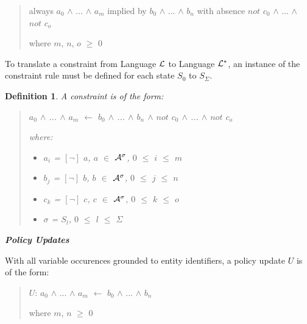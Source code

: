\documentclass[10pt, twocolumn]{article}
\newtheorem{definition}{Definition}
\begin{document}
          \begin{quote}
            always $a_{0}$ $\land$ ... $\land$ $a_{m}$
            implied by $b_{0}$ $\land$ ... $\land$ $b_{n}$
            with absence $not$ $c_{0}$ $\land$ ... $\land$ $not$ $c_{o}$

            where $m$, $n$, $o$ $\geq$ $0$
          \end{quote}

          To translate a constraint from Language ${\cal L}$ to Language
          ${\cal L}^{*}$, an instance of the constraint rule must be defined
          for each state $S_{0}$ to $S_{\Sigma}$.

          \begin{definition}
            A constraint is of the form:

            \begin{quote}
              $a_{0}$ $\land$ ... $\land$ $a_{m}$ $\leftarrow$ $b_{0}$ $\land$ ... $\land$ $b_{n}$ $\land$ $not$ $c_{0}$ $\land$ ... $\land$ $not$ $c_{o}$

              where:

              \begin{itemize}
                \item
                  $a_{i}$ = $[\lnot]$ $a$, $a$ $\in$ ${\cal A}^{\sigma}$, $0$ $\leq$ $i$ $\leq$ $m$
                \item
                  $b_{j}$ = $[\lnot]$ $b$, $b$ $\in$ ${\cal A}^{\sigma}$, $0$ $\leq$ $j$ $\leq$ $n$
                \item
                  $c_{k}$ = $[\lnot]$ $c$, $c$ $\in$ ${\cal A}^{\sigma}$, $0$ $\leq$ $k$ $\leq$ $o$
                \item
                  $\sigma$ = $S_{l}$, $0$ $\leq$ $l$ $\leq$ $\Sigma$
              \end{itemize}

            \end{quote}

          \end{definition}

        \noindent \textbf{\emph{Policy Updates}}

          With all variable occurences grounded to entity identifiers, a
          policy update $U$ is of the form:

          \begin{quote}
            $U$: $a_{0}$ $\land$ ... $\land$ $a_{m}$ $\leftarrow$ $b_{0}$ $\land$ ... $\land$ $b_{n}$

            where $m$, $n$ $\geq$ $0$
          \end{quote}
\end{document}
